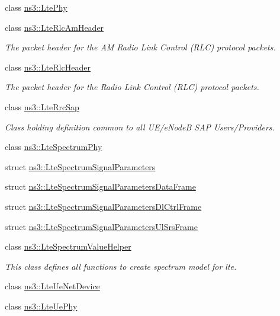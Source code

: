 \begin{DoxyCompactItemize}
class \hyperlink{classns3_1_1LtePhy}{ns3\+::\+Lte\+Phy}
\item 
class \hyperlink{classns3_1_1LteRlcAmHeader}{ns3\+::\+Lte\+Rlc\+Am\+Header}
\begin{DoxyCompactList}\small\item\em The packet header for the AM Radio Link Control (R\+LC) protocol packets. \end{DoxyCompactList}\item 
class \hyperlink{classns3_1_1LteRlcHeader}{ns3\+::\+Lte\+Rlc\+Header}
\begin{DoxyCompactList}\small\item\em The packet header for the Radio Link Control (R\+LC) protocol packets. \end{DoxyCompactList}\item 
class \hyperlink{classns3_1_1LteRrcSap}{ns3\+::\+Lte\+Rrc\+Sap}
\begin{DoxyCompactList}\small\item\em Class holding definition common to all U\+E/e\+NodeB S\+AP Users/\+Providers. \end{DoxyCompactList}\item 
class \hyperlink{classns3_1_1LteSpectrumPhy}{ns3\+::\+Lte\+Spectrum\+Phy}
\item 
struct \hyperlink{structns3_1_1LteSpectrumSignalParameters}{ns3\+::\+Lte\+Spectrum\+Signal\+Parameters}
\item 
struct \hyperlink{structns3_1_1LteSpectrumSignalParametersDataFrame}{ns3\+::\+Lte\+Spectrum\+Signal\+Parameters\+Data\+Frame}
\item 
struct \hyperlink{structns3_1_1LteSpectrumSignalParametersDlCtrlFrame}{ns3\+::\+Lte\+Spectrum\+Signal\+Parameters\+Dl\+Ctrl\+Frame}
\item 
struct \hyperlink{structns3_1_1LteSpectrumSignalParametersUlSrsFrame}{ns3\+::\+Lte\+Spectrum\+Signal\+Parameters\+Ul\+Srs\+Frame}
\item 
class \hyperlink{classns3_1_1LteSpectrumValueHelper}{ns3\+::\+Lte\+Spectrum\+Value\+Helper}
\begin{DoxyCompactList}\small\item\em This class defines all functions to create spectrum model for lte. \end{DoxyCompactList}\item 
class \hyperlink{classns3_1_1LteUeNetDevice}{ns3\+::\+Lte\+Ue\+Net\+Device}
\item 
class \hyperlink{classns3_1_1LteUePhy}{ns3\+::\+Lte\+Ue\+Phy}
\item 

\end{DoxyCompactItemize}
